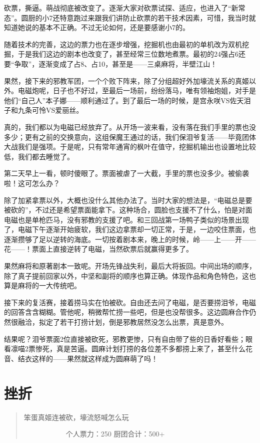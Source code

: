 砍票，撕逼。萌战彻底被改变了。逐渐大家对砍票试探、适应，也进入了“新常态”。圆厨的小7还特意跑过来跟我们讲防止砍票的若干技术因素，可惜，我当时就知道她说的基本不正确。不过无论如何，还是要感谢小7的。

随着技术的完善，这边的票力也在逐步增强，挖掘机也由最初的单机改为双机挖掘，于是我们这边的剧本也改变了，甚至经常三位数地煮票。最初的24强占6还要“争取”，逐渐变成了占8、占10，甚至是——三桌麻将，半壁江山！

果然，接下来的邪教军团，一个个败下阵来，除了分组超好外加壕流关系的真姬以外。电磁炮呢，日子也不好过，至最后一场前，纷纷落马，唯有领袖炮姐，对手是他们“自己人”本子娜——顺利通过了。到了最后一场的时候，是宫永咲VS佐天泪子和九条可怜VS爱丽丝。

真的，我们都以为电磁已经放弃了。从开场一波来看，没有落在我们手里的票也没多少；更有之前的交换意向，这组保魔王通过的话，我们保泪爷复活——毕竟团体大战我们是强项。于是呢，只有常年通宵的枫叶在值守，挖掘机输出也设置地比较低，我们都去睡觉了。

第二天早上一看，顿时傻眼了。票面被虐了一大截，手里的票也没多少。被偷袭啦！这可怎么办？

除了加紧拿票以外，大概也没什么其他办法了。当时大家的想法是，“电磁总是要被砍的”，不过还是希望票面能拿下。这种场合，圆脸也支援不了什么，怕是对面电磁也是单枪匹马，没有邪教的支援了吧。和三回战第一场鸭子类似的场景出现了，电磁下午逐渐开始疲软，我们这边拿票却一切正常，于是，一边咬住票面，也逐渐攒够了足以逆转的海底。一切按着剧本来，晚上的时候，岭——上——开——花——！票面上直接逆转了电磁，当然砍票后就赢得更多了。

果然麻将和原著剧本一致呢。开场先锋战失利，最后大将扳回。中间出场的顺序，除了真子提前回家以外，中坚和副将的顺序也算正确。体现作品和角色特色，这也算是麻将的一大传统吧。

接下来的复活赛，接着捞马实在怕被砍。自由还去问了电磁，是否要捞泪爷，电磁的回答含含糊糊。管他呢，稍微帮忙捞一些吧，但是也没帮很多。这边圆麻合作仍然很融洽，拟定了若干打捞计划，倒是邪教居然没怎么出票，真是意外。

结果呢？泪爷票面2位直接被砍死，邪教更惨，只有自由带了些的日香好看些；眼看凛喵2票惨死，真是苦逼。圆麻计划打捞的各位差不多都捞上来了，甚至什么花音、结衣这样的——果然就这样成为圆麻萌了吗！


\section{挫折}
\begin{quote}
笨蛋真姬连被砍，壕流怒喊怎么玩

　　　　　　个人票力：250 厨团合计：500+
\end{quote}

